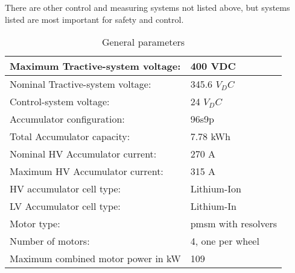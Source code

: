There are other control and measuring systems not listed above, but systems listed are most important for safety and control.


\begin{table}[H]
	\centering
	\caption{General parameters}
	\begin{tabularx}{\textwidth}{|X|X|}
		\hline
		Maximum Tractive-system voltage: & 400 VDC  \\[\TableSize]
		\hline Nominal Tractive-system voltage: & 345.6 $V_DC$\\[\TableSize]
		\hline
		Control-system voltage: & 24 $V_DC$ \\[\TableSize]
		\hline
		Accumulator configuration: & 96s9p \\[\TableSize]
		\hline
		Total Accumulator capacity: & 7.78 kWh\\[\TableSize]
		\hline
		Nominal HV Accumulator current: & 270 A \\[\TableSize]
		\hline
		Maximum HV Accumulator current: & 315 A \\[\TableSize]
		\hline
		HV accumulator cell type: & Lithium-Ion  \\[\TableSize]
		\hline
		LV Accumulator cell type: & Lithium-In \\[\TableSize]
		\hline
		Motor type: & \gls{pmsm} with resolvers \\[\TableSize]
		\hline
		Number of motors: &  4, one per wheel \\[\TableSize]
		\hline
		Maximum combined motor power in kW & 109 \\[\TableSize]
		\hline
	\end{tabularx}%
	\label{tab:system-general}%
\end{table}%
